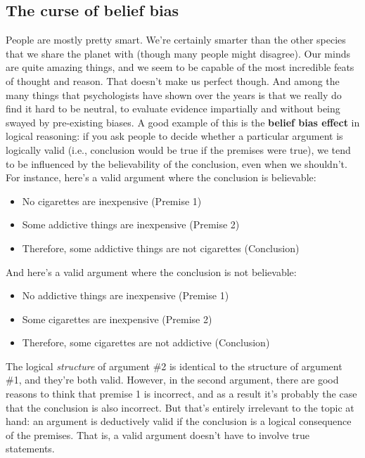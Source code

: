 \documentclass[
]{book}
\providecommand{\tightlist}{%
  \setlength{\itemsep}{0pt}\setlength{\parskip}{0pt}}
\begin{document}
\subsection{The curse of belief bias}\label{the-curse-of-belief-bias}

People are mostly pretty smart. We're certainly smarter than the other species that we share the planet with (though many people might disagree). Our minds are quite amazing things, and we seem to be capable of the most incredible feats of thought and reason. That doesn't make us perfect though. And among the many things that psychologists have shown over the years is that we really do find it hard to be neutral, to evaluate evidence impartially and without being swayed by pre-existing biases. A good example of this is the \textbf{belief bias effect} in logical reasoning: if you ask people to decide whether a particular argument is logically valid (i.e., conclusion would be true if the premises were true), we tend to be influenced by the believability of the conclusion, even when we shouldn't. For instance, here's a valid argument where the conclusion is believable:

\begin{itemize}
\tightlist
\item
  No cigarettes are inexpensive (Premise 1)
\item
  Some addictive things are inexpensive (Premise 2)
\item
  Therefore, some addictive things are not cigarettes (Conclusion)
\end{itemize}

And here's a valid argument where the conclusion is not believable:

\begin{itemize}
\tightlist
\item
  No addictive things are inexpensive (Premise 1)
\item
  Some cigarettes are inexpensive (Premise 2)
\item
  Therefore, some cigarettes are not addictive (Conclusion)
\end{itemize}

The logical \emph{structure} of argument \#2 is identical to the structure of argument \#1, and they're both valid. However, in the second argument, there are good reasons to think that premise 1 is incorrect, and as a result it's probably the case that the conclusion is also incorrect. But that's entirely irrelevant to the topic at hand: an argument is deductively valid if the conclusion is a logical consequence of the premises. That is, a valid argument doesn't have to involve true statements.
\end{document}
